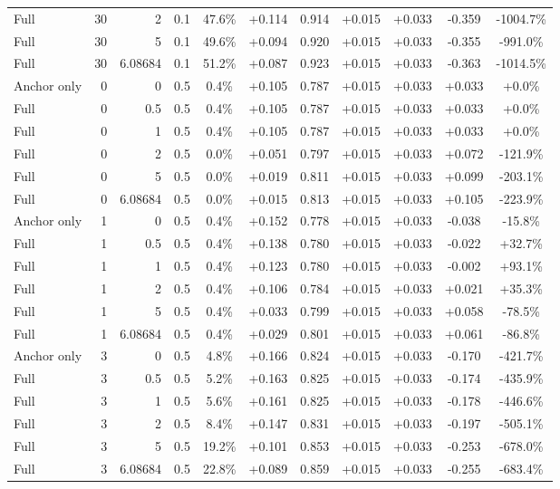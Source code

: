 \begin{table}[htbp]
\begin{tabular}{lrrrccccccc}
Full & 30 & 2 & 0.1 & 47.6\% & +0.114 & 0.914 & +0.015 & +0.033 & -0.359 & -1004.7\% \\
Full & 30 & 5 & 0.1 & 49.6\% & +0.094 & 0.920 & +0.015 & +0.033 & -0.355 & -991.0\% \\
Full & 30 & 6.08684 & 0.1 & 51.2\% & +0.087 & 0.923 & +0.015 & +0.033 & -0.363 & -1014.5\% \\
Anchor only & 0 & 0 & 0.5 & 0.4\% & +0.105 & 0.787 & +0.015 & +0.033 & +0.033 & +0.0\% \\
Full & 0 & 0.5 & 0.5 & 0.4\% & +0.105 & 0.787 & +0.015 & +0.033 & +0.033 & +0.0\% \\
Full & 0 & 1 & 0.5 & 0.4\% & +0.105 & 0.787 & +0.015 & +0.033 & +0.033 & +0.0\% \\
Full & 0 & 2 & 0.5 & 0.0\% & +0.051 & 0.797 & +0.015 & +0.033 & +0.072 & -121.9\% \\
Full & 0 & 5 & 0.5 & 0.0\% & +0.019 & 0.811 & +0.015 & +0.033 & +0.099 & -203.1\% \\
Full & 0 & 6.08684 & 0.5 & 0.0\% & +0.015 & 0.813 & +0.015 & +0.033 & +0.105 & -223.9\% \\
Anchor only & 1 & 0 & 0.5 & 0.4\% & +0.152 & 0.778 & +0.015 & +0.033 & -0.038 & -15.8\% \\
Full & 1 & 0.5 & 0.5 & 0.4\% & +0.138 & 0.780 & +0.015 & +0.033 & -0.022 & +32.7\% \\
Full & 1 & 1 & 0.5 & 0.4\% & +0.123 & 0.780 & +0.015 & +0.033 & -0.002 & +93.1\% \\
Full & 1 & 2 & 0.5 & 0.4\% & +0.106 & 0.784 & +0.015 & +0.033 & +0.021 & +35.3\% \\
Full & 1 & 5 & 0.5 & 0.4\% & +0.033 & 0.799 & +0.015 & +0.033 & +0.058 & -78.5\% \\
Full & 1 & 6.08684 & 0.5 & 0.4\% & +0.029 & 0.801 & +0.015 & +0.033 & +0.061 & -86.8\% \\
Anchor only & 3 & 0 & 0.5 & 4.8\% & +0.166 & 0.824 & +0.015 & +0.033 & -0.170 & -421.7\% \\
Full & 3 & 0.5 & 0.5 & 5.2\% & +0.163 & 0.825 & +0.015 & +0.033 & -0.174 & -435.9\% \\
Full & 3 & 1 & 0.5 & 5.6\% & +0.161 & 0.825 & +0.015 & +0.033 & -0.178 & -446.6\% \\
Full & 3 & 2 & 0.5 & 8.4\% & +0.147 & 0.831 & +0.015 & +0.033 & -0.197 & -505.1\% \\
Full & 3 & 5 & 0.5 & 19.2\% & +0.101 & 0.853 & +0.015 & +0.033 & -0.253 & -678.0\% \\
Full & 3 & 6.08684 & 0.5 & 22.8\% & +0.089 & 0.859 & +0.015 & +0.033 & -0.255 & -683.4\% \\

\end{tabular}
\end{table}
